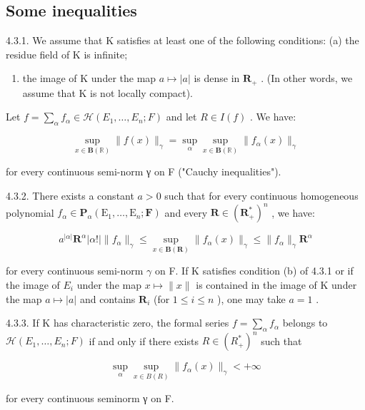 \subsection{Some inequalities}

4.3.1. We assume that K satisfies at least one of the following conditions: (a) the residue field of K is infinite;

\begin{enumerate}
\def\labelenumi{(\alph{enumi})}
\setcounter{enumi}{1}
\tightlist
\item
  the image of K under the map \(a \mapsto |a|\) is dense in \(\mathbf{R}_{+}\) . (In other words, we assume that K is not locally compact).
\end{enumerate}

Let \(f = \sum_{\alpha} f_{\alpha} \in \mathcal{H}(E_1, \ldots, E_n; F)\) and let \(R \in I(f)\) . We have:

\[
\sup _ {x \in \mathbf {B} (\mathbb {R})} \| f (x) \| _ {\gamma} = \sup _ {\alpha} \sup _ {x \in \mathbf {B} (\mathbb {R})} \| f _ {\alpha} (x) \| _ {\gamma}
\]

for every continuous semi-norm γ on F ("Cauchy inequalities").

4.3.2. There exists a constant \(a > 0\) such that for every continuous homogeneous polynomial \(f_{\alpha} \in \mathbf{P}_{\alpha}(\mathrm{E}_{1}, \ldots, \mathrm{E}_{n}; \mathbf{F})\) and every \(\mathbf{R} \in (\mathbf{R}_{+}^{*})^{n}\) , we have:

\[
a ^ {| \alpha |} \mathbf {R} ^ {\alpha} | \alpha ! | \| f _ {\alpha} \| _ {\gamma} \leqslant \sup _ {x \in \mathbf {B} (\mathbf {R})} \| f _ {\alpha} (x) \| _ {\gamma} \leqslant \| f _ {\alpha} \| _ {\gamma} \mathbf {R} ^ {\alpha}
\]

for every continuous semi-norm \(\gamma\) on F. If K satisfies condition (b) of 4.3.1 or if the image of \(E_{i}\) under the map \(x \mapsto \|x\|\) is contained in the image of K under the map \(a \mapsto |a|\) and contains \(\mathbf{R}_{i}\) (for \(1 \leqslant i \leqslant n\) ), one may take \(a = 1\) .

4.3.3. If K has characteristic zero, the formal series \(f = \sum_{\alpha} f_{\alpha}\) belongs to \(\mathcal{H}(E_1, \ldots, E_n; F)\) if and only if there exists \(R \in (R_+^*)^n\) such that

\[
\sup _ {\alpha} \sup _ {x \in B (R)} \| f _ {\alpha} (x) \| _ {\gamma} <   + \infty
\]

for every continuous seminorm γ on F.

